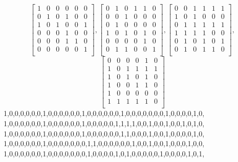 $$
\left[
\begin{array}{*{6}{r}}
1 & 0 & 0 & 0 & 0 & 0\\
0 & 1 & 0 & 1 & 0 & 0\\
1 & 0 & 1 & 0 & 0 & 1\\
0 & 0 & 0 & 1 & 0 & 0\\
0 & 0 & 0 & 1 & 1 & 0\\
0 & 0 & 0 & 0 & 0 & 1\\
\end{array}
\right]
, 
\left[
\begin{array}{*{6}{r}}
0 & 1 & 0 & 1 & 1 & 0\\
0 & 0 & 1 & 0 & 0 & 0\\
0 & 1 & 0 & 0 & 0 & 0\\
1 & 0 & 1 & 0 & 1 & 0\\
0 & 0 & 0 & 0 & 1 & 0\\
0 & 1 & 1 & 0 & 0 & 1\\
\end{array}
\right]
, 
\left[
\begin{array}{*{6}{r}}
0 & 0 & 1 & 1 & 1 & 1\\
1 & 0 & 1 & 0 & 0 & 0\\
0 & 1 & 1 & 1 & 1 & 1\\
1 & 1 & 1 & 1 & 0 & 0\\
0 & 1 & 0 & 1 & 0 & 1\\
0 & 1 & 0 & 1 & 1 & 0\\
\end{array}
\right]
, 
$$
$$
\left[
\begin{array}{*{6}{r}}
0 & 0 & 0 & 0 & 1 & 0\\
1 & 0 & 1 & 1 & 1 & 1\\
1 & 0 & 1 & 0 & 1 & 0\\
1 & 0 & 0 & 1 & 1 & 0\\
1 & 0 & 0 & 0 & 0 & 0\\
1 & 1 & 1 & 1 & 1 & 0\\
\end{array}
\right]
$$
1,0,0,0,0,0,0,1,0,0,0,0,0,0,1,0,0,0,0,0,0,1,0,0,0,0,0,0,0,1,0,0,0,0,1,0,\\
1,0,0,0,0,0,0,1,0,0,0,0,0,0,1,0,0,0,0,0,1,1,1,1,0,0,1,0,0,1,0,0,1,0,1,0,\\
1,0,0,0,0,0,0,1,0,0,0,0,0,0,1,0,0,0,0,0,0,1,1,0,0,0,1,0,0,1,0,0,0,0,1,0,\\
1,0,0,0,0,0,0,1,0,0,0,0,0,0,0,1,1,0,0,0,0,0,0,1,0,0,1,0,0,1,0,0,0,1,0,0,\\
1,0,0,0,0,0,0,1,0,0,0,0,0,0,0,1,0,0,0,0,1,0,1,0,0,0,0,0,1,0,0,0,0,1,0,1,\\
